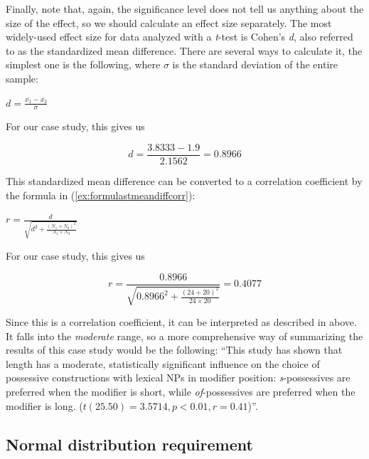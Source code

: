 Finally, note that, again, the significance  level does not tell us anything about the size of the effect, so we should calculate an effect size  separately. The most widely\hyp{}used effect size for data analyzed with a \textit{t}-test  is Cohen's \textit{d}, also referred to as the standardized mean  difference. There are several ways to calculate it, the simplest one is the following, where $\sigma$ is the standard deviation of the entire sample:

\begin{exe}
\ex $\displaystyle{d = \frac{\overline{x_1} - \overline{x_2}}{\sigma}}$
\label{ex:formulastmeandiff}
\end{exe}

For our case study, this gives us

\[d =\frac{3.8333 - 1.9}{2.1562} = 0.8966\]

This standardized mean  difference can be converted to a correlation  coefficient by the formula in (\ref{ex:formulastmeandiffcorr}):

\begin{exe}
\ex $\displaystyle{r = \frac d{\sqrt{d^2 + \frac{(N_1 + N_2)^2}{N_1 \times N_2}}}}$
\label{ex:formulastmeandiffcorr}
\end{exe}

For our case study, this gives us

\[r = \frac{0.8966}{\sqrt{0.8966^2 + \frac{(24 + 20)^2}{24 \times 20}}} = 0.4077\]

Since this is a correlation  coefficient, it can be interpreted as described in  above. It falls into the \textit{moderate} range, so a more comprehensive way of summarizing the results of this case study would be the following: ``This study has shown that length  has a moderate, statistically significant  influence on the choice of possessive  constructions with lexical NPs in modifier position: \textit{s}-pos\-ses\-sives are preferred when the modifier is short, while \textit{of}-possessives are preferred when the modifier is long. ($t(25.50) = 3.5714, p < 0.01, r = 0.41$)''.

\subsection{Normal distribution requirement}
\label{sec:normaldistribution}

